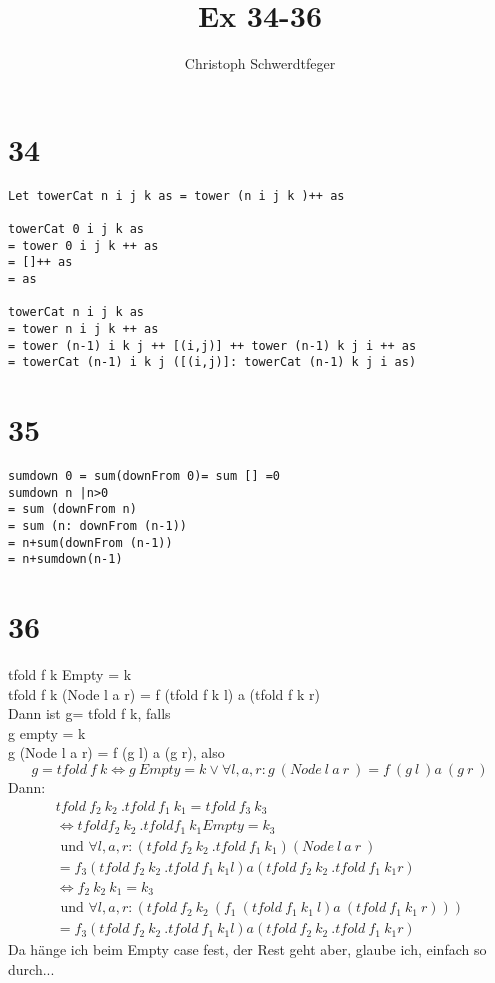 \documentclass[10pt]{article}
\title{Ex 34-36}
\author{Christoph Schwerdtfeger}
\begin{document}
\maketitle
\section{34}
\begin{verbatim}
Let towerCat n i j k as = tower (n i j k )++ as

towerCat 0 i j k as 
= tower 0 i j k ++ as 
= []++ as
= as

towerCat n i j k as 
= tower n i j k ++ as
= tower (n-1) i k j ++ [(i,j)] ++ tower (n-1) k j i ++ as
= towerCat (n-1) i k j ([(i,j)]: towerCat (n-1) k j i as)
\end{verbatim}
\section{35}
\begin{verbatim}
sumdown 0 = sum(downFrom 0)= sum [] =0
sumdown n |n>0 
= sum (downFrom n) 
= sum (n: downFrom (n-1)) 
= n+sum(downFrom (n-1))
= n+sumdown(n-1)
\end{verbatim}
\section{36}
tfold f k Empty = k
\\tfold f k (Node l a r) = f (tfold f k l) a (tfold f k r)
\\Dann ist g= tfold f k, falls
\\g empty = k
\\g (Node l a r) = f (g l) a (g r),
also $$g=tfold\ f\ k \Longleftrightarrow g\ Empty = k \vee \forall l,a,r: g\ (Node\ l\ a\ r\ )= f\ (g\ l\ ) a\ (g\ r\ )$$
Dann: 
\begin{align*}
tfold\ f_2\ k_2\ . tfold\ f_1\ k_1 = tfold\ f_3\ k_3
\\ \Longleftrightarrow tfold f_2\ k_2\ . tfold f_1\ k_1 Empty = k_3 \\\text{ und } \forall l,a,r: (tfold\ f_2\ k_2\ . tfold\ f_1\ k_1 ) (Node\ l\ a\ r\ ) \\= f_3 (tfold\ f_2\ k_2\ . tfold\ f_1\ k_1 l) a (tfold\ f_2\ k_2\ . tfold\ f_1\ k_1 r) 
\\ \Longleftrightarrow f_2\ k_2\ k_1  = k_3 \\\text{ und } \forall l,a,r: (tfold\ f_2\ k_2\ (f_1\ (tfold\ f_1\ k_1\ l) a\  (tfold\ f_1\ k_1\ r))) \\ = f_3 (tfold\ f_2\ k_2\ . tfold\ f_1\ k_1 l) a (tfold\ f_2\ k_2\ . tfold\ f_1\ k_1 r) 
\end{align*}
Da hänge ich beim Empty case fest, der Rest geht aber, glaube ich, einfach so durch...
\end{document}
